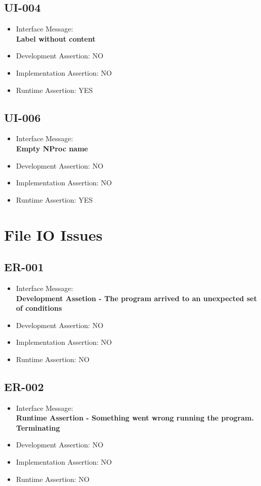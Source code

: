 \subsection{UI-004}
\begin{itemize}
  \item Interface Message:\\[1em]\textbf{Label without content}
  \item Development Assertion: NO
  \item Implementation Assertion: NO
  \item Runtime Assertion: YES
\end{itemize}

\subsection{UI-006}
\begin{itemize}
  \item Interface Message:\\[1em]\textbf{Empty NProc name}
  \item Development Assertion: NO
  \item Implementation Assertion: NO
  \item Runtime Assertion: YES
\end{itemize}

\section{File IO Issues}

\subsection{ER-001}
\begin{itemize}
  \item Interface Message:\\[1em]\textbf{Development Assetion - The program arrived to an unexpected set of conditions}
  \item Development Assertion: NO
  \item Implementation Assertion: NO
  \item Runtime Assertion: NO
\end{itemize}

\subsection{ER-002}
\begin{itemize}
  \item Interface Message:\\[1em]\textbf{Runtime Assertion - Something went wrong running the program. Terminating}
  \item Development Assertion: NO
  \item Implementation Assertion: NO
  \item Runtime Assertion: NO
\end{itemize}

